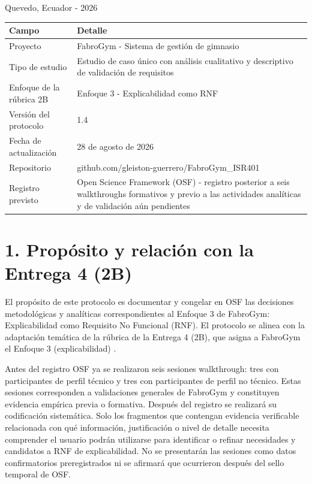 \documentclass[9pt,a4paper]{extarticle}
\begin{document}
\vfill
\begin{center}
Quevedo, Ecuador - 2026
\end{center}
\clearpage

\tableofcontents
\clearpage

\begin{longtable}{@{}p{}p{}@{}}
\toprule
\textbf{Campo} & \textbf{Detalle} \\
\midrule
\endhead
Proyecto & FabroGym - Sistema de gestión de gimnasio \\
Tipo de estudio & Estudio de caso único con análisis cualitativo y descriptivo de validación de requisitos \\
Enfoque de la rúbrica 2B & Enfoque 3 - Explicabilidad como RNF \\
Versión del protocolo & 1.4 \\
Fecha de actualización & 28 de agosto de 2026 \\
Repositorio & github.com/gleiston-guerrero/FabroGym\_ISR401 \\
Registro previsto & Open Science Framework (OSF) - registro posterior a seis walkthroughs formativos y previo a las actividades analíticas y de validación aún pendientes \\
\bottomrule
\end{longtable}

\section*{1. Propósito y relación con la Entrega 4 (2B)}

El propósito de este protocolo es documentar y congelar en OSF las decisiones metodológicas y analíticas correspondientes al Enfoque 3 de FabroGym: Explicabilidad como Requisito No Funcional (RNF). El protocolo se alinea con la adaptación temática de la rúbrica de la Entrega 4 (2B), que asigna a FabroGym el Enfoque 3 (explicabilidad) \cite{uteq2026}.

Antes del registro OSF ya se realizaron seis sesiones walkthrough: tres con participantes de perfil técnico y tres con participantes de perfil no técnico. Estas sesiones corresponden a validaciones generales de FabroGym y constituyen evidencia empírica previa o formativa. Después del registro se realizará su codificación sistemática. Solo los fragmentos que contengan evidencia verificable relacionada con qué información, justificación o nivel de detalle necesita comprender el usuario podrán utilizarse para identificar o refinar necesidades y candidatos a RNF de explicabilidad. No se presentarán las sesiones como datos confirmatorios preregistrados ni se afirmará que ocurrieron después del sello temporal de OSF.
\end{document}
